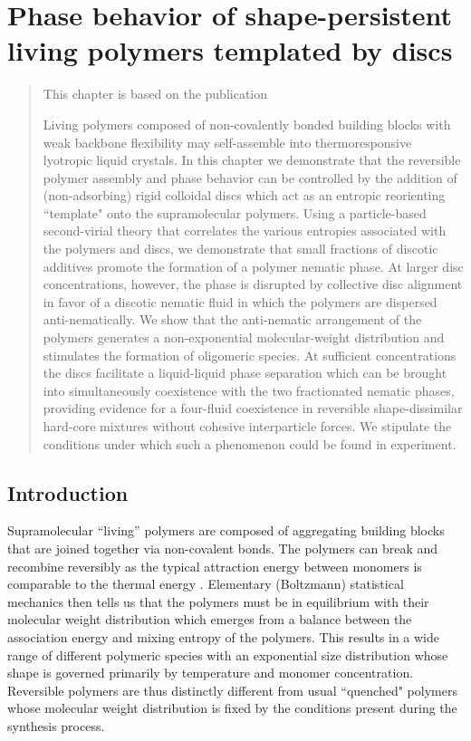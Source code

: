 
\chapter{Phase behavior of shape-persistent living polymers templated by discs}
\label{disc_polymer}

\begin{abstract}

    This chapter is based on the publication \cite{PhysRevE.104.054505}

    Living polymers composed of non-covalently bonded  building blocks with weak backbone flexibility may self-assemble into thermoresponsive lyotropic liquid crystals. In this chapter we demonstrate that the reversible polymer assembly and phase behavior  can be  controlled by the addition of (non-adsorbing) rigid colloidal discs which act as an entropic reorienting ``template"  onto the supramolecular polymers. Using a particle-based second-virial theory that correlates the various entropies associated with the polymers and discs, we demonstrate that small fractions of discotic additives promote the formation of a polymer nematic phase. At larger disc concentrations, however, the phase is disrupted by collective disc alignment in favor of a discotic nematic fluid in which the polymers are dispersed anti-nematically. We show that the anti-nematic arrangement of the polymers generates a non-exponential molecular-weight distribution and stimulates the formation of oligomeric species. At sufficient concentrations the discs  facilitate a liquid-liquid phase separation which can be brought into simultaneously coexistence with the two fractionated nematic phases, providing evidence for a four-fluid coexistence in reversible shape-dissimilar hard-core mixtures without cohesive interparticle forces.  We  stipulate the conditions under which such a phenomenon could be found in experiment.

\end{abstract}

\section{Introduction}


 Supramolecular ``living'' polymers are composed of  aggregating building blocks that are joined together via non-covalent bonds.  The polymers can break and recombine reversibly as the typical attraction energy between monomers is comparable to the thermal energy \cite{cates87,cates88}.  Elementary (Boltzmann) statistical mechanics then tells us that the polymers must be in equilibrium with their molecular weight distribution which emerges from a balance between the association energy and mixing entropy of the polymers. This results in a wide range of different polymeric species with an exponential size distribution whose shape is governed primarily by temperature and  monomer concentration. Reversible polymers are thus distinctly different from usual ``quenched" polymers whose molecular weight distribution is fixed  by the conditions present during the synthesis process.
 
